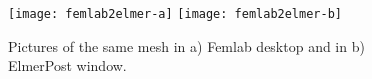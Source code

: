 
%
%

\begin{figure}[H]
\centering
\texttt{[image: femlab2elmer-a]}
\hspace{10mm}
\texttt{[image: femlab2elmer-b]}
\caption{Pictures of the same mesh in a) Femlab desktop and in b) ElmerPost window.}
\label{fg:pic6}
\end{figure}


